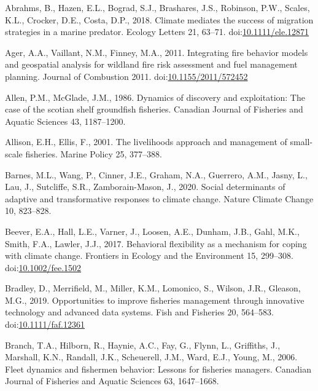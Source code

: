 \documentclass[]{elsarticle} %
\begin{document}
\leavevmode\hypertarget{ref-Abrahms2018}{}%
Abrahms, B., Hazen, E.L., Bograd, S.J., Brashares, J.S., Robinson, P.W.,
Scales, K.L., Crocker, D.E., Costa, D.P., 2018. Climate mediates the
success of migration strategies in a marine predator. Ecology Letters
21, 63--71.
doi:\href{https://doi.org/10.1111/ele.12871}{10.1111/ele.12871}

\leavevmode\hypertarget{ref-Ager2011}{}%
Ager, A.A., Vaillant, N.M., Finney, M.A., 2011. Integrating fire
behavior models and geospatial analysis for wildland fire risk
assessment and fuel management planning. Journal of Combustion 2011.
doi:\href{https://doi.org/10.1155/2011/572452}{10.1155/2011/572452}

\leavevmode\hypertarget{ref-Allen1986}{}%
Allen, P.M., McGlade, J.M., 1986. Dynamics of discovery and
exploitation: The case of the scotian shelf groundfish fisheries.
Canadian Journal of Fisheries and Aquatic Sciences 43, 1187--1200.

\leavevmode\hypertarget{ref-Allison2001}{}%
Allison, E.H., Ellis, F., 2001. The livelihoods approach and management
of small-scale fisheries. Marine Policy 25, 377--388.

\leavevmode\hypertarget{ref-barnes2020social}{}%
Barnes, M.L., Wang, P., Cinner, J.E., Graham, N.A., Guerrero, A.M.,
Jasny, L., Lau, J., Sutcliffe, S.R., Zamborain-Mason, J., 2020. Social
determinants of adaptive and transformative responses to climate change.
Nature Climate Change 10, 823--828.

\leavevmode\hypertarget{ref-Beever2017}{}%
Beever, E.A., Hall, L.E., Varner, J., Loosen, A.E., Dunham, J.B., Gahl,
M.K., Smith, F.A., Lawler, J.J., 2017. Behavioral flexibility as a
mechanism for coping with climate change. Frontiers in Ecology and the
Environment 15, 299--308.
doi:\href{https://doi.org/10.1002/fee.1502}{10.1002/fee.1502}

\leavevmode\hypertarget{ref-Bradley2019}{}%
Bradley, D., Merrifield, M., Miller, K.M., Lomonico, S., Wilson, J.R.,
Gleason, M.G., 2019. Opportunities to improve fisheries management
through innovative technology and advanced data systems. Fish and
Fisheries 20, 564--583.
doi:\href{https://doi.org/10.1111/faf.12361}{10.1111/faf.12361}

\leavevmode\hypertarget{ref-Branch2006}{}%
Branch, T.A., Hilborn, R., Haynie, A.C., Fay, G., Flynn, L., Griffiths,
J., Marshall, K.N., Randall, J.K., Scheuerell, J.M., Ward, E.J., Young,
M., 2006. Fleet dynamics and fishermen behavior: Lessons for fisheries
managers. Canadian Journal of Fisheries and Aquatic Sciences 63,
1647--1668.
\end{document}
